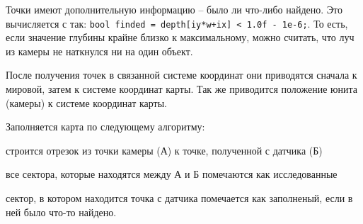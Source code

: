 Точки имеют дополнительную информацию -- было ли что-либо найдено.
Это вычисляется с так: \verb|bool finded = depth[iy*w+ix] < 1.0f - 1e-6;|.
То есть, если значение глубины крайне близко к максимальному, можно считать, что
луч из камеры не наткнулся ни на один объект.

После получения точек в связанной системе координат они приводятся
сначала к мировой, затем к системе координат карты.
Так же приводится положение юнита (камеры) к системе координат карты.

Заполняется карта по следующему алгоритму:
\begin{mintemize}
    \item строится отрезок из точки камеры (А) к точке, полученной с датчика (Б)
    \item все сектора, которые находятся между А и Б помечаются как исследованные
    \item сектор, в котором находится точка с датчика помечается как заполненый,
        если в ней было что-то найдено.
\end{mintemize}


